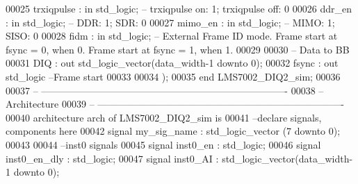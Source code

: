 \begin{DoxyCode}
00025         \textcolor{vhdlchar}{trxiqpulse}  \textcolor{vhdlchar}{:} \textcolor{keywordflow}{in} \textcolor{comment}{std\_logic};\textcolor{keyword}{ -- trxiqpulse on: 1; trxiqpulse off: 0}
00026         \textcolor{vhdlchar}{ddr_en}      \textcolor{vhdlchar}{:} \textcolor{keywordflow}{in} \textcolor{comment}{std\_logic};\textcolor{keyword}{ -- DDR: 1; SDR: 0}
00027         \textcolor{vhdlchar}{mimo_en}     \textcolor{vhdlchar}{:} \textcolor{keywordflow}{in} \textcolor{comment}{std\_logic};\textcolor{keyword}{ -- MIMO: 1; SISO: 0}
00028         \textcolor{vhdlchar}{fidm}            \textcolor{vhdlchar}{:} \textcolor{keywordflow}{in} \textcolor{comment}{std\_logic};\textcolor{keyword}{ -- External Frame ID mode. Frame start at fsync = 0, when 0. Frame
       start at fsync = 1, when 1. }
00029 
00030 \textcolor{keyword}{        -- Data to BB}
00031         \textcolor{vhdlchar}{DIQ}             \textcolor{vhdlchar}{:} \textcolor{keywordflow}{out} \textcolor{comment}{std\_logic\_vector}\textcolor{vhdlchar}{(}\textcolor{vhdlchar}{data_width}\textcolor{vhdlchar}{-}\textcolor{vhdllogic}{}\textcolor{vhdllogic}{1} \textcolor{keywordflow}{downto} \textcolor{vhdllogic}{}\textcolor{vhdllogic}{0}\textcolor{vhdlchar}{)};
00032         \textcolor{vhdlchar}{fsync}           \textcolor{vhdlchar}{:} \textcolor{keywordflow}{out} \textcolor{comment}{std\_logic}\textcolor{keyword}{ --Frame start}
00033         
00034         \textcolor{vhdlchar}{)};
00035 \textcolor{keywordflow}{end} \textcolor{vhdlchar}{LMS7002\_DIQ2\_sim};
00036 
00037 \textcolor{keyword}{-- ----------------------------------------------------------------------------}
00038 \textcolor{keyword}{-- Architecture}
00039 \textcolor{keyword}{-- ----------------------------------------------------------------------------}
00040 \textcolor{keywordflow}{architecture} arch \textcolor{keywordflow}{of} LMS7002_DIQ2_sim is
00041 \textcolor{keyword}{--declare signals,  components here}
00042 \textcolor{keywordflow}{signal} \textcolor{vhdlchar}{my_sig_name} \textcolor{vhdlchar}{:} \textcolor{comment}{std\_logic\_vector} \textcolor{vhdlchar}{(}\textcolor{vhdllogic}{}\textcolor{vhdllogic}{7} \textcolor{keywordflow}{downto} \textcolor{vhdllogic}{}\textcolor{vhdllogic}{0}\textcolor{vhdlchar}{)};
00043 
00044 \textcolor{keyword}{--inst0 signals}
00045 \textcolor{keywordflow}{signal} \textcolor{vhdlchar}{inst0_en}         \textcolor{vhdlchar}{:} \textcolor{comment}{std\_logic};
00046 \textcolor{keywordflow}{signal} \textcolor{vhdlchar}{inst0_en_dly}     \textcolor{vhdlchar}{:} \textcolor{comment}{std\_logic};
00047 \textcolor{keywordflow}{signal} \textcolor{vhdlchar}{inst0_AI}         \textcolor{vhdlchar}{:} \textcolor{comment}{std\_logic\_vector}\textcolor{vhdlchar}{(}\textcolor{vhdlchar}{data_width}\textcolor{vhdlchar}{-}\textcolor{vhdllogic}{}\textcolor{vhdllogic}{1} \textcolor{keywordflow}{downto} \textcolor{vhdllogic}{}\textcolor{vhdllogic}{0}\textcolor{vhdlchar}{)};

\end{DoxyCode}
